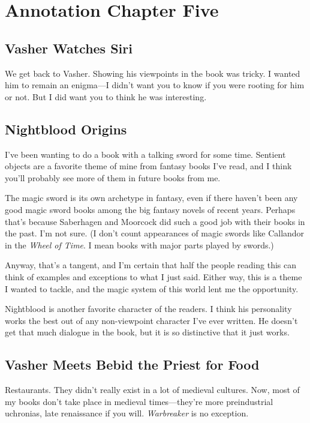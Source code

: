 \section{Annotation Chapter Five}

\subsection*{Vasher Watches Siri}

We get back to Vasher. Showing his viewpoints in the book was tricky. I wanted him to remain an enigma—I didn’t want you to know if you were rooting for him or not. But I did want you to think he was interesting.

\subsection*{Nightblood Origins}

I’ve been wanting to do a book with a talking sword for some time. Sentient objects are a favorite theme of mine from fantasy books I’ve read, and I think you’ll probably see more of them in future books from me.

The magic sword is its own archetype in fantasy, even if there haven’t been any good magic sword books among the big fantasy novels of recent years. Perhaps that’s because Saberhagen and Moorcock did such a good job with their books in the past. I’m not sure. (I don’t count appearances of magic swords like Callandor in the \textit{Wheel of Time}. I mean books with major parts played by swords.)

Anyway, that’s a tangent, and I’m certain that half the people reading this can think of examples and exceptions to what I just said. Either way, this is a theme I wanted to tackle, and the magic system of this world lent me the opportunity.

Nightblood is another favorite character of the readers. I think his personality works the best out of any non-viewpoint character I’ve ever written. He doesn’t get that much dialogue in the book, but it is so distinctive that it just works.

\subsection*{Vasher Meets Bebid the Priest for Food}

Restaurants. They didn’t really exist in a lot of medieval cultures. Now, most of my books don’t take place in medieval times—they’re more preindustrial uchronias, late renaissance if you will. \textit{Warbreaker} is no exception.

